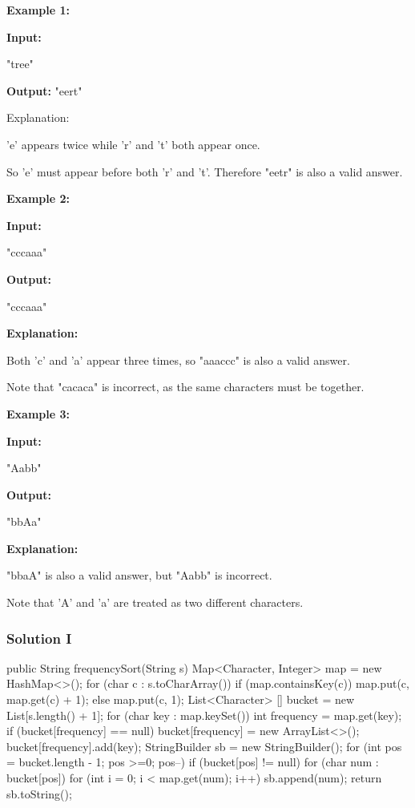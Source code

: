 \textbf{Example 1:}

\textbf{Input:}

"tree"

\textbf{Output:}
"eert"

\textbf{}Explanation:

'e' appears twice while 'r' and 't' both appear once.

So 'e' must appear before both 'r' and 't'. Therefore "eetr" is also a valid answer.

\textbf{Example 2:}

\textbf{Input:}

"cccaaa"

\textbf{Output:}

"cccaaa"

\textbf{Explanation:}

Both 'c' and 'a' appear three times, so "aaaccc" is also a valid answer.

Note that "cacaca" is incorrect, as the same characters must be together.

\textbf{Example 3:}

\textbf{Input:}

"Aabb"

\textbf{Output:}

"bbAa"

\textbf{Explanation:}

"bbaA" is also a valid answer, but "Aabb" is incorrect.

Note that 'A' and 'a' are treated as two different characters.

\subsubsection{Solution I}

\begin{Code}
public String frequencySort(String s) {
    Map<Character, Integer> map = new HashMap<>();
    for (char c : s.toCharArray()) {
        if (map.containsKey(c)) {
            map.put(c, map.get(c) + 1);
        } else {
            map.put(c, 1);
        }
    }
    List<Character> [] bucket = new List[s.length() + 1];
    for (char key : map.keySet()) {
        int frequency = map.get(key);
        if (bucket[frequency] == null) {
            bucket[frequency] = new ArrayList<>();
        }
        bucket[frequency].add(key);
    }
    StringBuilder sb = new StringBuilder();
    for (int pos = bucket.length - 1; pos >=0; pos--) {
        if (bucket[pos] != null) {
            for (char num : bucket[pos]) {
                for (int i = 0; i < map.get(num); i++) {
                    sb.append(num);
                }
            }
        }
    }
    return sb.toString();
}

\end{Code}

